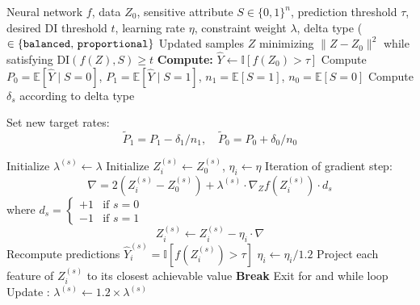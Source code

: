 \documentclass[runningheads, orivec]{llncs}
\begin{document}
\begin{algorithm}[H]
\caption{Fairwashing using Monge Kantorovich constrained projection algorithm \texttt{Grad}}
\label{app:alg:MK_c_proj}
\begin{algorithmic}[1]
\Require Neural network $f$, data $Z_0$, sensitive attribute $S \in \{0,1\}^n$, prediction threshold $\tau$, desired DI threshold $t$, learning rate $\eta$, constraint weight $\lambda$, delta type ($\in \{\text{\texttt{balanced}, \texttt{proportional}}\}$
\Ensure Updated samples $Z$ minimizing $\|Z - Z_0\|^2$ while satisfying $\mathrm{DI}(f(Z), S) \geq t$
\vspace{1mm}
\State \textbf{Compute:} $\widehat{Y} \gets \mathbb{I}[f(Z_0) > \tau]$ 
\State Compute $P_0 = \mathbb{E}[\widehat{Y} \mid S=0]$, $P_1 = \mathbb{E}[\widehat{Y} \mid S=1]$, $n_1 = \mathbb{E}[ S=1]$, $n_0 = \mathbb{E}[ S=0]$
\State Compute $\delta_s$ according to delta type 

\State Set new target rates:
\[
\tilde{P}_1 = P_1 - \delta_1/n_1, \quad
\tilde{P}_0 = P_0 + \delta_0/n_0
\]

    \State Initialize $\lambda^{(s)} \gets \lambda$
        \State Initialize $Z^{(s)}_i \gets Z_0^{(s)}$, $\eta_i \gets \eta$ 
            \State Iteration of gradient step:
            \[
            \nabla = 2(Z^{(s)}_i - Z_0^{(s)}) + \lambda^{(s)} \cdot \nabla_{Z} f(Z^{(s)}_i) \cdot d_s
            \]
            where $d_s = \begin{cases} +1 & \text{if } s=0 \\ -1 & \text{if } s=1 \end{cases}$
            \[
            Z^{(s)}_i \gets Z^{(s)}_i - \eta_i \cdot \nabla
            \]
            \State Recompute predictions $\widehat{Y}^{(s)}_i = \mathbb{I}[f(Z^{(s)}_i) > \tau]$
            \State $\eta_i \gets \eta_i / 1.2$ 
            \State Project each feature of $Z^{(s)}_i$ to its closest achievable value
        \EndIf
            \State \textbf{Break} Exit for and while loop
        \EndIf
        \EndFor
        \State Update : $\lambda^{(s)} \gets 1.2 \times\lambda^{(s)}$ 
        

\end{algorithmic}
\end{algorithm}
\end{document}
